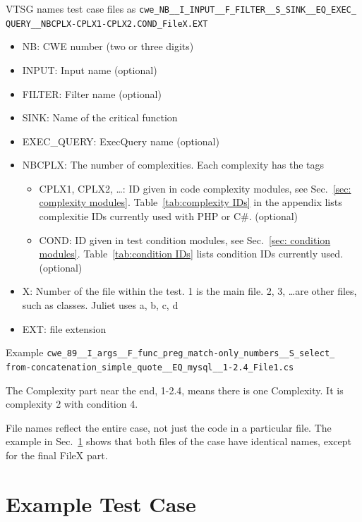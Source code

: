 \documentclass[12pt]{article}
\newcommand{\CSharp}{C{\fontseries{b}\selectfont\#}}
\begin{document}
VTSG names test case files as
\verb|cwe_NB__I_INPUT__F_FILTER__S_SINK__EQ_EXEC_| \\
\verb|QUERY__NBCPLX-CPLX1-CPLX2.COND_FileX.EXT|
\begin{itemize}
    \item NB:  CWE number (two or three digits)
    \item INPUT:  Input name (optional)
    \item FILTER:  Filter name (optional)
    \item SINK:  Name of the critical function
    \item EXEC\_QUERY:  ExecQuery name (optional)
    
    \item NBCPLX:  The number of complexities. Each complexity has the tags 
    \begin{itemize}
        \item CPLX1, CPLX2, \ldots: ID given in 
            code complexity modules, 
            see Sec.~\ref{sec: complexity modules}. 
            Table~\ref{tab:complexity IDs} in the appendix 
            lists complexitie IDs currently used with 
            PHP or \CSharp.
            (optional)
        \item COND: ID given in test condition modules,
            see Sec.~\ref{sec: condition modules}.
            Table~\ref{tab:condition IDs} lists condition 
            IDs currently used. (optional)
    \end{itemize}
    \item X: Number of the file within the test. 
    1 is the main file. 2, 3, 
    \ldots are other files, such as classes. {\Large Juliet uses a, b, c, d}
    \item EXT: file extension
\end{itemize}

Example
\verb|cwe_89__I_args__F_func_preg_match-only_numbers__S_select_| \\
\verb|from-concatenation_simple_quote__EQ_mysql__1-2.4_File1.cs|

The Complexity part near the end, 1-2.4, means there is one Complexity. 
It is complexity 2 with condition 4.

File names reflect the entire case, not just the code in a 
particular file.  The
example in Sec.~\ref{sec:generated files} shows that both 
files of the case have
identical names, except for the final FileX part.

\section{Example Test Case}
\label{sec:generated files}
\end{document}
